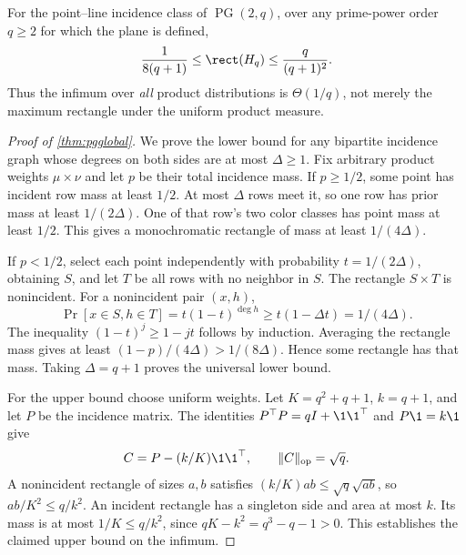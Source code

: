 \begin{theorem}\label{thm:pgglobal}
For the point--line incidence class of $\operatorname{PG}(2,q)$, over any prime-power order $q\ge2$ for which the plane is defined,
\[
 \frac1{8(q+1)}\le\rect(H_q)\le\frac{q}{(q+1)^2}.
\]
Thus the infimum over \emph{all} product distributions is $\Theta(1/q)$, not merely the maximum rectangle under the uniform product measure.
\end{theorem}

\begin{proof}[Proof of \cref{thm:pgglobal}]
We prove the lower bound for any bipartite incidence graph whose degrees on both sides are at most $\Delta\ge1$. Fix arbitrary product weights $\mu\times\nu$ and let $p$ be their total incidence mass. If $p\ge1/2$, some point has incident row mass at least $1/2$. At most $\Delta$ rows meet it, so one row has prior mass at least $1/(2\Delta)$. One of that row's two color classes has point mass at least $1/2$. This gives a monochromatic rectangle of mass at least $1/(4\Delta)$.

If $p<1/2$, select each point independently with probability $t=1/(2\Delta)$, obtaining $S$, and let $T$ be all rows with no neighbor in $S$. The rectangle $S\times T$ is nonincident. For a nonincident pair $(x,h)$,
\[
 \Pr[x\in S,h\in T]=t(1-t)^{\deg h}
 \ge t(1-\Delta t)=1/(4\Delta).
\]
The inequality $(1-t)^j\ge1-jt$ follows by induction. Averaging the rectangle mass gives at least $(1-p)/(4\Delta)>1/(8\Delta)$. Hence some rectangle has that mass. Taking $\Delta=q+1$ proves the universal lower bound.

For the upper bound choose uniform weights. Let $K=q^2+q+1$, $k=q+1$, and let $P$ be the incidence matrix. The identities $P^\top P=qI+\1\1^\top$ and $P\1=k\1$ give
\[
 C=P-(k/K)\1\1^\top,\qquad \|C\|_{\rm op}=\sqrt q.
\]
A nonincident rectangle of sizes $a,b$ satisfies $(k/K)ab\le\sqrt q\sqrt{ab}$, so $ab/K^2\le q/k^2$. An incident rectangle has a singleton side and area at most $k$. Its mass is at most $1/K\le q/k^2$, since $qK-k^2=q^3-q-1>0$. This establishes the claimed upper bound on the infimum.
\end{proof}
